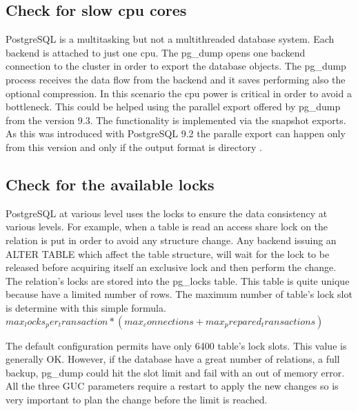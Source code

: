 \subsection{Check for slow cpu cores}
PostgreSQL is a multitasking but not a multithreaded database system. Each backend is attached 
to just one cpu. The pg\_dump opens one backend connection to the cluster in order to 
export the database objects. The pg\_dump process receives the data flow from the backend and it 
saves performing also the optional compression. In this scenario the cpu power is critical in order 
to avoid a bottleneck. This could be helped using the parallel export offered by pg\_dump from the 
version 9.3. The functionality is implemented via  the snapshot exports. As this was introduced 
with PostgreSQL 9.2 the paralle export can happen only from this version and only if the output 
format is directory . 

\subsection{Check for the available locks}
PostgreSQL at various level uses the locks to ensure the data consistency at various levels. For 
example, when a table is read an access share lock on the relation is put in order to avoid any 
structure change. Any backend issuing an ALTER TABLE which affect the table structure, will wait 
for the lock to be released before acquiring itself an exclusive lock and then perform the change.
The relation's locks are stored into the pg\_locks table. This table is quite unique because have 
a limited number of rows. The maximum number of table's lock slot is determine with this simple 
formula.\newline
\begin{math}
 max_locks_per_transaction * (max_connections + max_prepared_transactions)
\end{math}\newline

The default configuration permits have only 6400 table's lock slots. This value is generally OK. 
However, if the database have a great number of relations, a full backup, pg\_dump could hit the 
slot limit and fail with an out of memory error.\newline
All the three GUC parameters require a restart to apply the new changes so is very important to 
plan the change before the limit is reached. 


